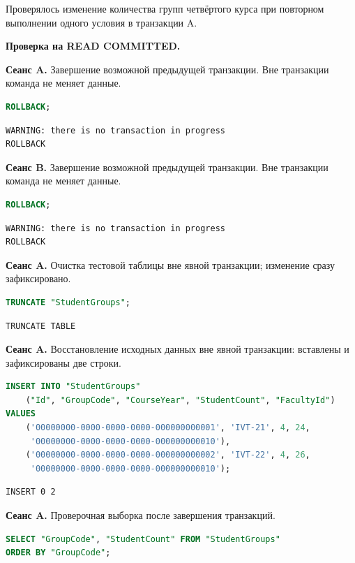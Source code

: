 \documentclass[12pt,a4paper]{article}
\begin{document}
Проверялось изменение количества групп четвёртого курса при повторном выполнении одного условия в транзакции A.

\textbf{Проверка на READ COMMITTED.}

\textbf{Сеанс A.} Завершение возможной предыдущей транзакции. Вне транзакции команда не меняет данные.
\begin{lstlisting}[language=SQL]
ROLLBACK;
\end{lstlisting}

\begin{lstlisting}
WARNING: there is no transaction in progress
ROLLBACK
\end{lstlisting}

\textbf{Сеанс B.} Завершение возможной предыдущей транзакции. Вне транзакции команда не меняет данные.
\begin{lstlisting}[language=SQL]
ROLLBACK;
\end{lstlisting}

\begin{lstlisting}
WARNING: there is no transaction in progress
ROLLBACK
\end{lstlisting}

\textbf{Сеанс A.} Очистка тестовой таблицы вне явной транзакции; изменение сразу зафиксировано.
\begin{lstlisting}[language=SQL]
TRUNCATE "StudentGroups";
\end{lstlisting}

\begin{lstlisting}
TRUNCATE TABLE
\end{lstlisting}

\textbf{Сеанс A.} Восстановление исходных данных вне явной транзакции: вставлены и зафиксированы две строки.
\begin{lstlisting}[language=SQL]
INSERT INTO "StudentGroups"
    ("Id", "GroupCode", "CourseYear", "StudentCount", "FacultyId")
VALUES
    ('00000000-0000-0000-0000-000000000001', 'IVT-21', 4, 24,
     '00000000-0000-0000-0000-000000000010'),
    ('00000000-0000-0000-0000-000000000002', 'IVT-22', 4, 26,
     '00000000-0000-0000-0000-000000000010');
\end{lstlisting}

\begin{lstlisting}
INSERT 0 2
\end{lstlisting}

\textbf{Сеанс A.} Проверочная выборка после завершения транзакций.
\begin{lstlisting}[language=SQL]
SELECT "GroupCode", "StudentCount" FROM "StudentGroups"
ORDER BY "GroupCode";
\end{lstlisting}
\end{document}
